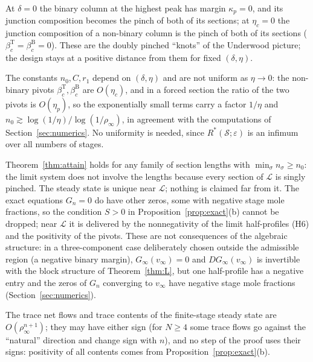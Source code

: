 \documentclass[11pt,a4paper]{report}
\newcommand{\cS}{\mathcal S}
\newcommand{\cL}{\mathcal L}
\newcommand{\Ts}{\mathrm T}
\newcommand{\Bs}{\mathrm B}
\begin{document}
\begin{remark}
At \(\delta=0\) the binary column at the highest peak has margin \(\kappa_p=0\), and its junction composition becomes the pinch of
both of its sections; at \(\eta_c=0\) the junction composition of a non-binary column is the pinch of both of its sections
(\(\beta^\Ts_c=\beta^\Bs_c=0\)). These are the doubly pinched ``knots'' of the Underwood picture; the design stays at a positive
distance from them for fixed \((\delta,\eta)\).
\end{remark}

\begin{remark}
The constants \(n_0,C,r_1\) depend on \((\delta,\eta)\) and are not uniform as \(\eta\to0\): the non-binary pivots \(\beta^\Ts_c,\beta^\Bs_c\)
are \(O(\eta_c)\), and in a forced section the ratio of the two pivots is \(O(\eta_p)\), so the exponentially small terms carry a factor
\(1/\eta\) and \(n_0\gtrsim\log(1/\eta)/\log(1/\rho_\infty)\), in agreement with the computations of Section~\ref{sec:numerics}.
No uniformity is needed, since \(R^*(\cS;\varepsilon)\) is an infimum over all numbers of stages.
\end{remark}

\begin{remark}\label{rem:nonphysical}
Theorem~\ref{thm:attain} holds for any family of section lengths with \(\min_\sigma n_\sigma\ge n_0\): the limit system does not involve
the lengths because every section of \(\cL\) is singly pinched. The steady state is unique near \(\cL\); nothing is claimed far from
it. The exact equations \(G_n=0\) do have other zeros, some with negative stage mole fractions, so the condition \(S>0\) in
Proposition~\ref{prop:exact}(b) cannot be dropped; near \(\cL\) it is delivered by the nonnegativity of the limit half-profiles
(H6) and the positivity of the pivots. These are not consequences of the algebraic structure: in a three-component case
deliberately chosen outside the admissible region (a negative binary margin), \(G_\infty(v_\infty)=0\) and \(DG_\infty(v_\infty)\) is
invertible with the block structure of Theorem~\ref{thm:L}, but one half-profile has a negative entry and the zeros of \(G_n\)
converging to \(v_\infty\) have negative stage mole fractions (Section~\ref{sec:numerics}).
\end{remark}

\begin{remark}
The trace net flows and trace contents of the finite-stage steady state are \(O(\rho_\infty^{n+1})\); they may have either
sign (for \(N\ge4\) some trace flows go against the ``natural'' direction and change sign with \(n\)), and no step of the proof
uses their signs: positivity of all contents comes from Proposition~\ref{prop:exact}(b).
\end{remark}
\end{document}
